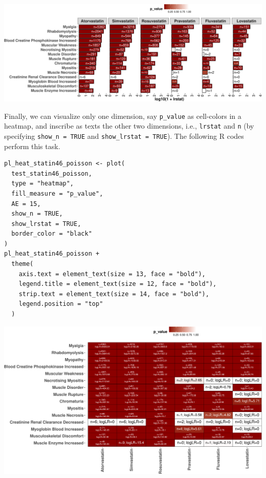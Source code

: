 \begin{center}\includegraphics[width=1\linewidth]{RJ-2023-027_files/figure-latex/barplot-poisson-statin46-1} \end{center}

Finally, we can visualize only one dimension, say \texttt{p\_value} as cell-colors in a heatmap, and inscribe as texts the other two dimensions, i.e., \texttt{lrstat} and \texttt{n} (by specifying \texttt{show\_n\ =\ TRUE} and \texttt{show\_lrstat\ =\ TRUE}). The following R codes perform this task.

\begin{verbatim}
pl_heat_statin46_poisson <- plot(
  test_statin46_poisson,
  type = "heatmap",
  fill_measure = "p_value",
  AE = 15,
  show_n = TRUE,
  show_lrstat = TRUE,
  border_color = "black"
)
pl_heat_statin46_poisson +
  theme(
    axis.text = element_text(size = 13, face = "bold"),
    legend.title = element_text(size = 12, face = "bold"),
    strip.text = element_text(size = 14, face = "bold"),
    legend.position = "top"
  )
\end{verbatim}

\begin{center}\includegraphics[width=1\linewidth]{RJ-2023-027_files/figure-latex/create-heatmap-poisson-statin46-1} \end{center}

